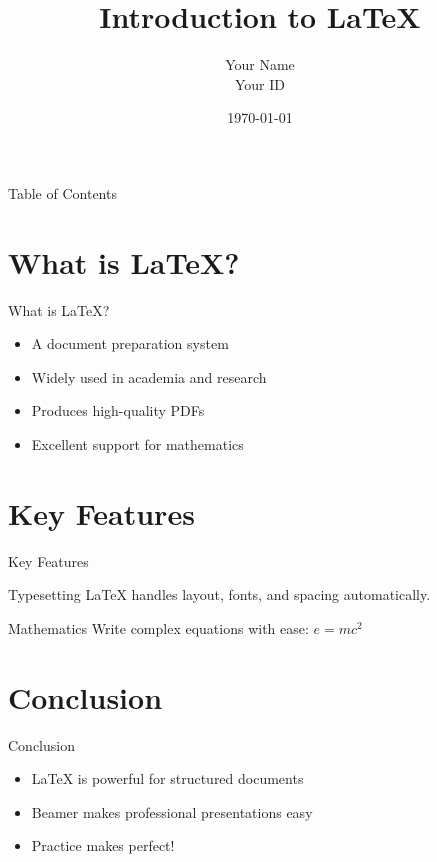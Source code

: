 ﻿\documentclass{beamer}
\title{Introduction to LaTeX}
\author{Your Name \\ Your ID}
\institute{Your Course}
\date{\today}
\begin{document}
\begin{frame}
    \titlepage
\end{frame}

\begin{frame}{Table of Contents}
    \tableofcontents
\end{frame}

\section{What is LaTeX?}

\begin{frame}{What is LaTeX?}
    \begin{itemize}
        \item A document preparation system
        \item Widely used in academia and research
        \item Produces high-quality PDFs
        \item Excellent support for mathematics
    \end{itemize}
\end{frame}

\section{Key Features}

\begin{frame}{Key Features}
    \begin{block}{Typesetting}
        LaTeX handles layout, fonts, and spacing automatically.
    \end{block}
    \begin{block}{Mathematics}
        Write complex equations with ease: $e = mc^2$
    \end{block}
\end{frame}

\section{Conclusion}

\begin{frame}{Conclusion}
    \begin{itemize}
        \item LaTeX is powerful for structured documents
        \item Beamer makes professional presentations easy
        \item Practice makes perfect!
    \end{itemize}
\end{frame}
\end{document}
